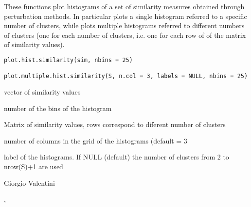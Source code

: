 \documentclass{article}
\begin{document}
\begin{Description}\relax
These functions plot histograms of a set of similarity measures obtained through perturbation methods.
In particular  plots a single histogram referred to a specific number of clusters,
while  plots multiple histograms referred to different numbers of clusters
(one for each number of clusters, i.e. one for each row of
of the matrix  of similarity values).
\end{Description}
\begin{Usage}
\begin{verbatim}
plot.hist.similarity(sim, nbins = 25)

plot.multiple.hist.similarity(S, n.col = 3, labels = NULL, nbins = 25)
\end{verbatim}
\end{Usage}
\begin{Arguments}
\begin{ldescription}
\item[\code{sim}] vector of similarity values 
\item[\code{nbins}] number of the bins of the histogram 
\item[\code{S}] Matrix of similarity values, rows correspond to diferent number of clusters 
\item[\code{n.col}] number of columns in the grid of the histograms (default = 3 
\item[\code{labels}] label of the histograms. If NULL (default) the number of clusters from 2 to nrow(S)+1 are used 
\end{ldescription}
\end{Arguments}
\begin{Author}\relax
Giorgio Valentini 
\end{Author}
\begin{SeeAlso}\relax
{},  
\end{SeeAlso}
\end{document}
